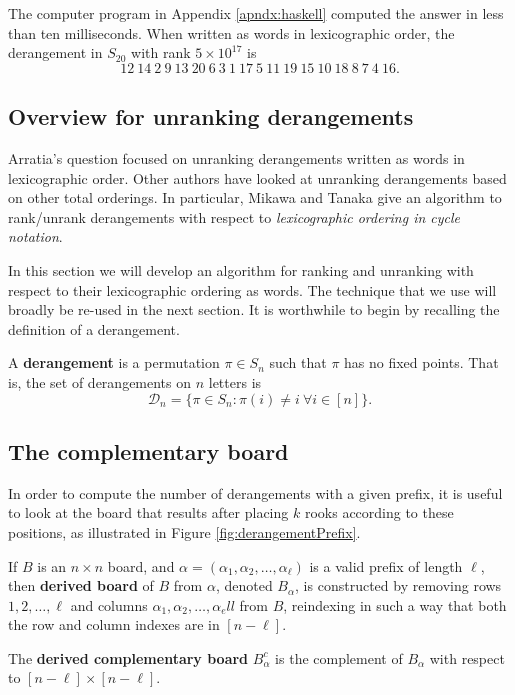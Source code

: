 \begin{answer}
The computer program in Appendix \ref{apndx:haskell} computed the answer in less than ten
milliseconds. When written as words in lexicographic order, the
derangement in $S_{20}$ with rank $5 \times 10^{17}$ is \begin{equation}
  12\ 14\ 2\ 9\ 13\ 20\ 6\ 3\ 1\ 17\ 5\ 11\ 19\ 15\ 10\ 18\ 8\ 7\ 4\ 16.
\end{equation}
\end{answer}

\subsection{Overview for unranking derangements}
Arratia's question focused on unranking derangements written as words in
lexicographic order.
Other authors have looked at unranking derangements based on other total
orderings. In particular, Mikawa and Tanaka \cite{Mikawa2014} give an algorithm
to rank/unrank derangements
with respect to \textit{lexicographic ordering in cycle notation}.

In this section we will develop an algorithm for ranking and unranking with
respect to their lexicographic ordering as words. The technique that we use will
broadly be re-used in the next section.
It is worthwhile to begin by recalling the definition of a derangement.
\begin{definition}
  A \textbf{derangement} is a permutation $\pi \in S_n$ such that $\pi$ has no
  fixed points. That is, the set of derangements on $n$ letters is \begin{equation}
    \mathcal{D}_n = \{\pi \in S_n : \pi(i) \neq i\ \forall i \in [n]\}.
  \end{equation}
\end{definition}

\subsection{The complementary board}
In order to compute the number of derangements with a given prefix, it is
useful to look at the board that results after placing $k$ rooks according to
these positions, as illustrated in Figure \ref{fig:derangementPrefix}.



\begin{definition}
  If $B$ is an $n \times n$ board, and
  $\alpha = (\alpha_1, \alpha_2, \dots, \alpha_\ell)$ is a valid prefix of length
  $\ell$, then \textbf{derived board} of $B$ from $\alpha$,
  denoted $B_\alpha$,
  is constructed by removing
  rows $1, 2, \dots, \ell$ and
  columns $\alpha_1, \alpha_2, \dots, \alpha_ell$ from $B$,
  reindexing in such a way that both the row and column indexes are in
  $[n - \ell]$.

  The \textbf{derived complementary board} $B_\alpha^c$ is the complement of
  $B_\alpha$ with respect to $[n - \ell] \times [n - \ell]$.
\end{definition}

